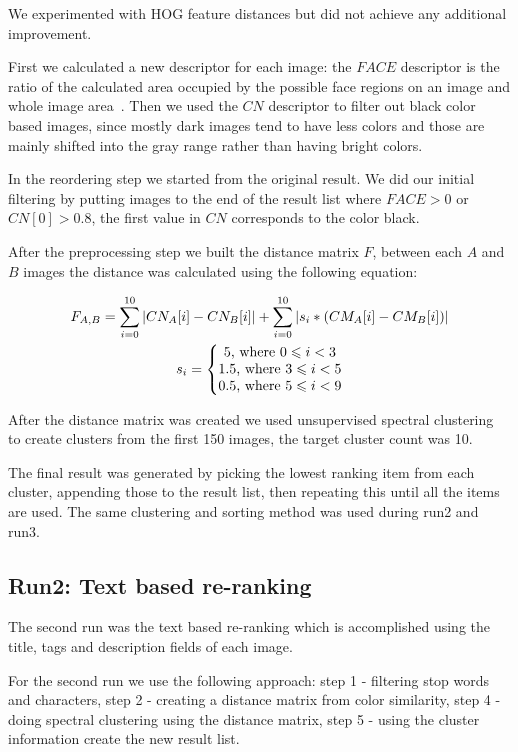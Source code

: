 \documentclass{acm_proc_article-me}
\begin{document}
We experimented with HOG feature distances but did not achieve any additional improvement.

First we calculated a new descriptor for each image: the $FACE$ descriptor is the ratio of the calculated area occupied by the possible face regions on an image and whole
image area~\cite{szHucs2013bmemtm}. Then we used the $CN$ descriptor to filter out black color based images, since mostly dark images tend to have less colors and those are mainly shifted into the gray range rather than having bright colors.

In the reordering step we started from the original result. We did our initial filtering by putting images to the end of the result list where $FACE>0$ or $CN[0]>0.8$, the first value in $CN$ corresponds to the color black.

After the preprocessing step we built the distance matrix $F$, between each $A$ and $B$ images the distance was calculated using the following equation:

\begin{gather*} 
F_{A,B} = \sum_{i=0}^{10}  \left | CN_{A}[i]-CN_{B}[i] \right | +\sum_{i=0}^{10} \left | s_i * (CM_{A}[i]-CM_{B}[i]) \right |\\
s_i = \left\{\begin{matrix}
5 \textup{, where }0 \leqslant  i < 3\\ 
1.5 \textup{, where }3 \leqslant  i < 5\\ 
0.5 \textup{, where }5 \leqslant  i < 9
\end{matrix}\right.
\end{gather*}

After the distance matrix was created we used unsupervised spectral clustering~\cite{Ma2009,Ng01onspectral} to create clusters from the first 150 images, the target cluster count was 10. 

The final result was generated by picking the lowest ranking item from each cluster, appending those to the result list, then repeating this until all the items are used. The same clustering and sorting method was used during run2 and run3.

\subsection{Run2: Text based re-ranking}\label{run2}
The second run was the text based re-ranking which is accomplished using the title, tags and description fields of each image.

For the second run we use the following approach: step 1 - filtering stop words and characters, step 2 - creating a distance matrix from color similarity, step 4 - doing spectral clustering using the distance matrix, step 5 - using the cluster information create the new result list.
\end{document}
